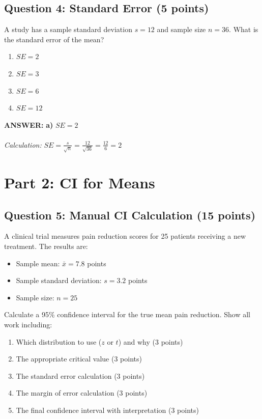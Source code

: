 \documentclass[11pt]{article}
\newcommand{\answer}[1]{\par\vspace{0.3em}\colorbox{green!10}{\parbox{\dimexpr\textwidth-2\fboxsep}{\textbf{ANSWER:} #1}}\vspace{0.3em}\par}
\begin{document}
\subsection*{Question 4: Standard Error (5 points)}

A study has a sample standard deviation $s = 12$ and sample size $n = 36$. What is the standard error of the mean?

\begin{enumerate}[label=\alph*)]
\item $SE = 2$
\item $SE = 3$
\item $SE = 6$
\item $SE = 12$
\end{enumerate}

\answer{\textbf{a)} $SE = 2$ \\ \\
\textit{Calculation:} $SE = \frac{s}{\sqrt{n}} = \frac{12}{\sqrt{36}} = \frac{12}{6} = 2$}

\section*{Part 2: CI for Means}

\subsection*{Question 5: Manual CI Calculation (15 points)}

A clinical trial measures pain reduction scores for 25 patients receiving a new treatment. The results are:
\begin{itemize}
\item Sample mean: $\bar{x} = 7.8$ points
\item Sample standard deviation: $s = 3.2$ points
\item Sample size: $n = 25$
\end{itemize}

Calculate a 95\% confidence interval for the true mean pain reduction. Show all work including:
\begin{enumerate}[label=\alph*)]
\item Which distribution to use ($z$ or $t$) and why (3 points)
\item The appropriate critical value (3 points)
\item The standard error calculation (3 points)
\item The margin of error calculation (3 points)
\item The final confidence interval with interpretation (3 points)
\end{enumerate}
\end{document}
